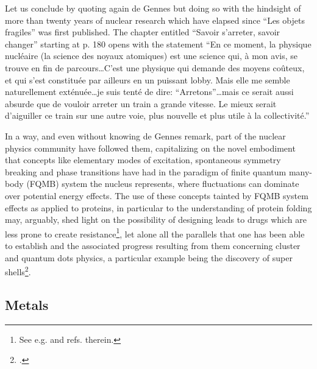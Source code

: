  Let us conclude by quoting again de Gennes but doing so with the hindsight of more than twenty years of nuclear research which have elapsed since ``Les objets fragiles'' was first published. The chapter entitled  ``Savoir s'arreter, savoir changer'' starting at p. 180 opens with the statement ``En ce moment, la physique nucl\'eaire (la science des noyaux atomiques) est une science qui, \`a mon avis, se trouve en fin de parcours\dots C'est une physique qui demande des moyens co\^uteux, et qui s'est constitu\'ee par ailleurs en un puissant lobby. Mais elle me semble naturellement ext\'enu\'ee\dots je suis tent\'e de dire: ``Arretons''\dots mais ce serait aussi absurde que de vouloir arreter un train a grande vitesse. Le mieux serait d'aiguiller ce train sur une autre voie, plus nouvelle et plus utile \`a la collectivit\'e.''


In a way, and even without knowing de Gennes remark, part of the nuclear physics community have followed them, capitalizing on the novel embodiment that concepts like elementary modes of excitation, spontaneous symmetry breaking and phase transitions have had in the paradigm of finite quantum many-body (FQMB) system the nucleus represents, where fluctuations can dominate over potential energy effects. The use of these concepts tainted by  FQMB system effects as applied to proteins, in particular to the understanding of protein folding may, arguably, shed light on the possibility of designing leads to  drugs which are less prone to create resistance\footnote{See e.g. \cite{Broglia:05,Rosner:17} and refs. therein.}, let alone all the parallels that one has been able to establish and the associated progress resulting from them concerning cluster and quantum dots physics, a particular example being the discovery of super shells\footnote{\cite{Pedersen:91,deHeer:87,Brack:93,Pacheco:91,Lipparini:03,Martin:94,Bjornholm:94}.}.







\subsection{Metals}\label{App3A2}
